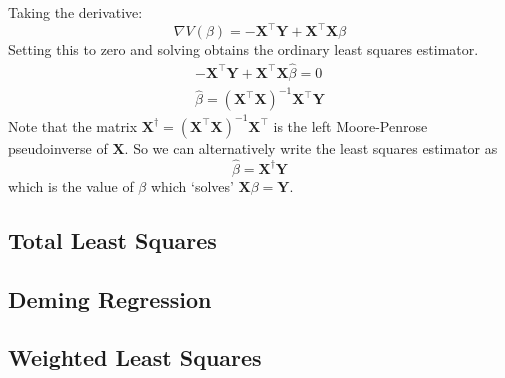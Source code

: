 \documentclass[11pt]{report} %
\begin{document}
Taking the derivative:
\begin{equation}
\nabla V\left(\beta\right) = -\mathbf{X}^{\top}\mathbf{Y} + \mathbf{X}^{\top}\mathbf{X}\beta
\end{equation}
Setting this to zero and solving obtains the ordinary least squares estimator.
\begin{gather}
-\mathbf{X}^{\top}\mathbf{Y} + \mathbf{X}^{\top}\mathbf{X}\hat{\beta} = 0 \\
\hat{\beta} = \left(\mathbf{X}^{\top}\mathbf{X}\right)^{-1}\mathbf{X}^{\top}\mathbf{Y}
\end{gather}
Note that the matrix $\mathbf{X}^{\dagger} = \left(\mathbf{X}^{\top}\mathbf{X}\right)^{-1}\mathbf{X}^{\top}$ is the left Moore-Penrose pseudoinverse of $\mathbf{X}$. So we can alternatively write the least squares estimator as
\begin{equation}
\hat{\beta} = \mathbf{X}^{\dagger}\mathbf{Y}
\end{equation}
which is the value of $\beta$ which `solves' $\mathbf{X}\beta = \mathbf{Y}$.

\subsection{Total Least Squares}

\subsection{Deming Regression}

\subsection{Weighted Least Squares}
\end{document}
